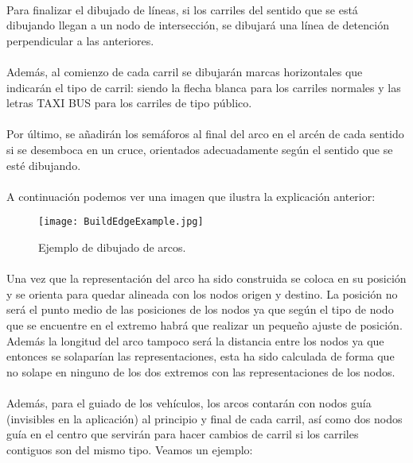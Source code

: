 	\paragraph{}
	Para finalizar el dibujado de líneas, si los carriles del sentido que se está dibujando llegan a un nodo de intersección, se dibujará una línea de detención perpendicular a las anteriores.
	\paragraph{}
	Además, al comienzo de cada carril se dibujarán marcas horizontales que indicarán el tipo de carril: siendo la flecha blanca para los carriles normales y las letras TAXI BUS para los carriles de tipo público.
	\paragraph{}
	Por último, se añadirán los semáforos al final del arco en el arcén de cada sentido si se desemboca en un cruce, orientados adecuadamente según el sentido que se esté dibujando.
	\paragraph{}
	A continuación podemos ver una imagen que ilustra la explicación anterior:
	
	\begin{figure}[H]
		\centering
			\texttt{[image: BuildEdgeExample.jpg]}
	\caption{Ejemplo de dibujado de arcos.}
	\label{fig:BuildEdgeExample}
	\end{figure}
	
	\paragraph{}
	Una vez que la representación del arco ha sido construida se coloca en su posición y se orienta para quedar alineada con los nodos origen y destino. La posición no será el punto medio de las posiciones de los nodos ya que según el tipo de nodo que se encuentre en el extremo habrá que realizar un pequeño ajuste de posición. Además la longitud del arco tampoco será la distancia entre los nodos ya que entonces se solaparían las representaciones, esta ha sido calculada de forma que no solape en ninguno de los dos extremos con las representaciones de los nodos.
	
	\paragraph{}
	Además, para el guiado de los vehículos, los arcos contarán con nodos guía (invisibles en la aplicación) al principio y final de cada carril, así como dos nodos guía en el centro que servirán para hacer cambios de carril si los carriles contiguos son del mismo tipo. Veamos un ejemplo:
	
